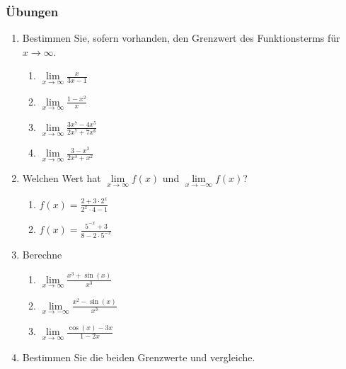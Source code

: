 \subsubsection{Übungen}
\begin{enumerate}
    \item Bestimmen Sie, sofern vorhanden, den Grenzwert des Funktionsterms für $x \to \infty$.
          \begin{enumerate}
              \item $\lim\limits_{x \to \infty} \frac{x}{3x - 1}$
              \item $\lim\limits_{x \to \infty} \frac{1 - x^2}{x}$
              \item $\lim\limits_{x \to \infty} \frac{3x^7 - 4x^5}{2x^7 + 7x^6}$
              \item $\lim\limits_{x \to \infty} \frac{3 - x^3}{2x^3 + x^2}$
          \end{enumerate}
    \item Welchen Wert hat $\lim\limits_{x \to \infty} f(x)$ und $\lim\limits_{x \to -\infty} f(x)$?

          \begin{enumerate}
              \item $f(x) = \frac{2 + 3 \cdot 2^x}{2^x \cdot 4 - 1}$
              \item $f(x) = \frac{5^{-x} + 3}{8 - 2 \cdot 5^{-x}}$
          \end{enumerate}

    \item
          Berechne

          \begin{enumerate}
              \item $\lim\limits_{x \to \infty} \frac{x^3 + \sin(x)}{x^3}$
              \item $\lim\limits_{x \to -\infty} \frac{x^2 - \sin(x)}{x^3}$
              \item $\lim\limits_{x \to \infty} \frac{\cos(x) - 3x}{1 - 2x}$
          \end{enumerate}
    \item Bestimmen Sie die beiden Grenzwerte und vergleiche.


\end{enumerate}
